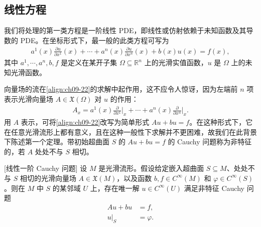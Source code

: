 \documentclass[../../main.tex]{subfiles}
\begin{document}
\subsection*{线性方程}

我们将处理的第一类方程是一阶线性 PDE，即线性或仿射依赖于未知函数及其导数的 PDE。在坐标形式下，最一般的此类方程可写为
\begin{align}
a^1(x)\frac{\partial u}{\partial x^1}(x)+\cdots+a^n(x)\frac{\partial u}{\partial x^n}(x)+b(x)u(x)=f(x), \label{align:ch09-22}
\end{align}
其中 $a^1,\cdots ,a^n,b,f$ 是定义在某开子集 $\Omega\subseteq\mathbb{R}^n$ 上的光滑实值函数，$u$ 是 $\Omega$ 上的未知光滑函数。

向量场的流在\eqref{align:ch09-22}的求解中起作用，这不应令人惊讶，因为左端前 $n$ 项表示光滑向量场 $A\in\mathfrak{X}(\Omega)$ 对 $u$ 的作用：
\begin{align}
A_x=a^1(x)\frac{\partial}{\partial x^1}\bigg|_x+\cdots+a^n(x)\frac{\partial}{\partial x^n}\bigg|_x. \label{align:ch09-23}
\end{align}
用 $A$ 表示，可将\eqref{align:ch09-22}改写为简单形式 $Au+bu=f$。在这种形式下，它在任意光滑流形上都有意义，且在这种一般性下求解并不更困难，故我们在此背景下陈述第一个定理。带初始超曲面 $S$ 的 $Au+bu=f$ 的 Cauchy 问题称为非特征的，若 $A$ 处处不与 $S$ 相切。

\begin{theorem}\label{theorem:ch09-51}[线性一阶 Cauchy 问题]
设 $M$ 是光滑流形。假设给定嵌入超曲面 $S\subseteq M$、处处不与 $S$ 相切的光滑向量场 $A\in\mathfrak{X}(M)$，以及函数 $b,f\in C^\infty(M)$ 和 $\varphi\in C^\infty(S)$。则在 $M$ 中 $S$ 的某邻域 $U$ 上，存在唯一解 $u\in C^\infty(U)$ 满足非特征 Cauchy 问题
\begin{align}
Au+bu&=f, \label{align:ch09-24}\\
u|_S&=\varphi. \label{align:ch09-25}
\end{align}
\end{theorem}
\end{document}
